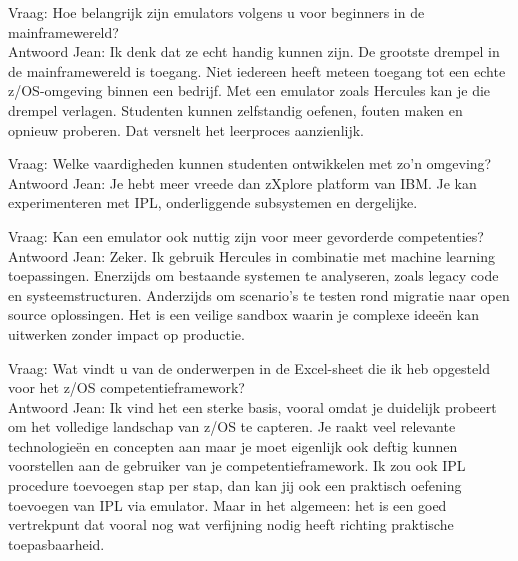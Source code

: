 {Vraag: Hoe belangrijk zijn emulators volgens u voor beginners in de mainframewereld?} \\
{Antwoord Jean:} Ik denk dat ze echt handig kunnen zijn. De grootste drempel in de mainframewereld is toegang. Niet iedereen heeft meteen toegang tot een echte z/OS-omgeving binnen een bedrijf. Met een emulator zoals Hercules kan je die drempel verlagen. Studenten kunnen zelfstandig oefenen, fouten maken en opnieuw proberen. Dat versnelt het leerproces aanzienlijk.

{Vraag: Welke vaardigheden kunnen studenten ontwikkelen met zo’n omgeving?} \\
{Antwoord Jean:} Je hebt meer vreede dan zXplore platform van IBM. Je kan experimenteren met IPL, onderliggende subsystemen en dergelijke.

{Vraag: Kan een emulator ook nuttig zijn voor meer gevorderde competenties?} \\
{Antwoord Jean:} Zeker. Ik gebruik Hercules in combinatie met machine learning toepassingen. Enerzijds om bestaande systemen te analyseren, zoals legacy code en systeemstructuren. Anderzijds om scenario’s te testen rond migratie naar open source oplossingen. Het is een veilige sandbox waarin je complexe ideeën kan uitwerken zonder impact op productie.

{Vraag: Wat vindt u van de onderwerpen in de Excel-sheet die ik heb opgesteld voor het z/OS competentieframework?} \\
{Antwoord Jean:} Ik vind het een sterke basis, vooral omdat je duidelijk probeert om het volledige landschap van z/OS te capteren. Je raakt veel relevante technologieën en concepten aan maar je moet eigenlijk ook deftig kunnen voorstellen aan de gebruiker van je competentieframework. 
Ik zou ook IPL procedure toevoegen stap per stap, dan kan jij ook een praktisch oefening toevoegen van IPL via emulator. Maar in het algemeen: het is een goed vertrekpunt dat vooral nog wat verfijning nodig heeft richting praktische toepasbaarheid.